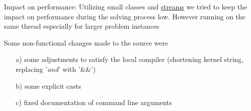 \documentclass[a4paper, 12pt]{scrartcl}
\begin{document}
Impact on performance:
Utilizing small classes and \href{http://www.cplusplus.com/reference/sstream/stringstream/}{streams} we tried to keep the impact on performance during the solving process low. However running on the same thread especially for larger problem instances 

Some non-functional changes made to the source were 
\begin{itemize}
	\item[a)] some adjustments to satisfy the local compiler (shortening kernel string, replacing '\emph{and}' with '\&\&')
	\item[b)] some explicit casts
	\item[c)] fixed documentation of command line arguments
\end{itemize}
\end{document}
